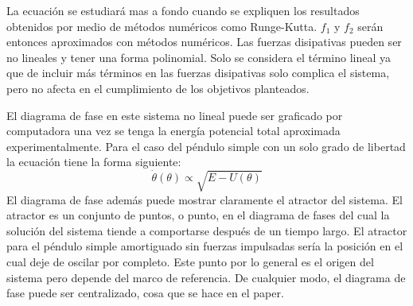 \documentclass[aps,twocolumn,secnumarabic,nobalancelastpage,amsmath,amssymb,nofootinbib]{revtex4-1}
\begin{document}
		\noindent La ecuaci\'on se estudiar\'a mas a fondo cuando se expliquen los resultados obtenidos por medio de m\'etodos num\'ericos como Runge-Kutta\cite{scheck2010mechanics}. $f_1$ y $f_2$ ser\'an entonces aproximados con m\'etodos num\'ericos. Las fuerzas disipativas pueden ser no lineales y tener una forma polinomial\cite{trueba2003generalized}. Solo se considera el t\'ermino lineal ya que de incluir m\'as t\'erminos en las fuerzas disipativas solo complica el sistema, pero no afecta en el cumplimiento de los objetivos planteados.   
	
	
		\indent El diagrama de fase en este sistema no lineal puede ser graficado por computadora\cite{marion2013classical} una vez se tenga la energ\'ia potencial total aproximada experimentalmente. Para el caso del p\'endulo simple con un solo grado de libertad la ecuaci\'on tiene la forma siguiente:
		\begin{equation}
			\dot{\theta}(\theta) \propto \sqrt{E-U(\theta)}
		\end{equation} 
		El diagrama de fase adem\'as puede mostrar claramente el atractor del sistema. El atractor es un conjunto de puntos, o punto, en el diagrama de fases del cual la soluci\'on del sistema tiende a comportarse despu\'es de un tiempo largo\cite{goldstein1980classical}. El atractor para el p\'endulo simple amortiguado sin fuerzas impulsadas ser\'ia la posici\'on en el cual deje de oscilar por completo\cite{tel2006chaotic}. Este punto por lo general es el origen del sistema pero depende del marco de referencia. De cualquier modo, el diagrama de fase puede ser centralizado, cosa que se hace en el paper.       
		   	
\end{document}
